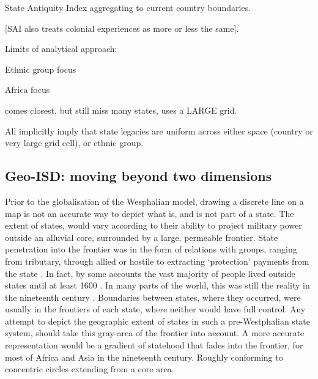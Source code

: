 State Antiquity Index
aggregating to current country boundaries. 

[SAI also treats colonial experiences as more or less the same].

Limits of analytical approach:

Ethnic group focus

Africa focus

\citet{Depetris-Chauvin2016} comes closest, but still miss many states, uses a
LARGE grid. 

All implicitly imply that state legacies are uniform across either space
(country or very large grid cell), or ethnic group.

\subsection{Geo-ISD: moving beyond two dimensions} 
\label{Geo-ISD}

Prior to the globalisation of the Wesphalian model, drawing a discrete line on a
map is not an accurate way to depict what is, and is not part of a state. The
extent of states, would vary according to their ability to project military
power outside an alluvial core, surrounded by a large, permeable frontier. State
penetration into the frontier was in the form of relations with groups, ranging
from tributary, through allied or hostile to extracting `protection' payments
from the state \citep{Scott2009}. In fact, by some accounts the vast majority of
people lived outside states until at least 1600 \citep{scott2017against,
Scott2009}. In many parts of the world, this was still the reality in the
nineteenth century \citep{Scott2009}. Boundaries between states, where they
occurred, were usually in the frontiers of each state, where neither would have
full control. Any attempt to depict the geographic extent of states in such a
pre-Westphalian state system, should take this gray-area of the frontier into
account. A more accurate representation would be a gradient of statehood that
fades into the frontier, for most of Africa and Asia in the nineteenth century.
Roughly conforming to concentric circles extending from a core area. 


